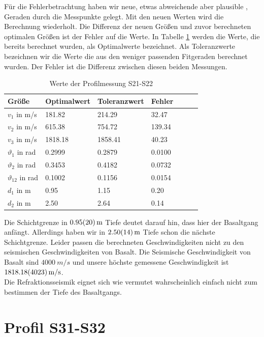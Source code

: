 Für die Fehlerbetrachtung haben wir neue, etwas abweichende aber plausible , Geraden durch die Messpunkte gelegt. Mit den neuen Werten wird die Berechnung wiederholt. Die Differenz der neuen Größen und zuvor berechneten optimalen Größen ist der Fehler auf die Werte. In Tabelle \ref{tab:S21-S22} werden die Werte, die bereits berechnet wurden, als Optimalwerte bezeichnet. Als Toleranzwerte bezeichnen wir die Werte die aus den weniger passenden Fitgeraden berechnet wurden. Der Fehler ist die Differenz zwischen diesen beiden Messungen.


\begin{table}[!ht]
\centering
\caption{Werte der Profilmessung S21-S22}
\label{tab:S21-S22}
\begin{tabular}{lllllll}
\toprule
Größe   & Optimalwert   & Toleranzwert   & Fehler \\
\midrule
$v_1$ in m/s & 181.82 & 214.29 & 32.47 \\
$v_2$ in m/s & 615.38 & 754.72 & 139.34 \\
$v_3$ in m/s & 1818.18 & 1858.41 & 40.23 \\
$\vartheta_1$ in rad & 0.2999 & 0.2879 & 0.0100 \\
$\vartheta_2$ in rad & 0.3453 & 0.4182 & 0.0732 \\
$\vartheta_{12}$ in rad & 0.1002 & 0.1156 & 0.0154 \\
$d_1$ in m & 0.95 & 1.15 & 0.20 \\
$d_2$ in m & 2.50 & 2.64 & 0.14 \\

\bottomrule
\end{tabular}
\end{table}


Die Schichtgrenze in $\SI{0.95 \pm 0.20}{m}$  Tiefe deutet darauf hin, dass hier der Basaltgang anfängt. Allerdings haben wir in $\SI{2.50 \pm 0.14}{m}$ Tiefe schon die nächste Schichtgrenze. Leider passen die berechneten Geschwindigkeiten nicht zu den seismischen Geschwindigkeiten von Basalt. Die Seismische Geschwindigkeit von Basalt sind $\SI{4000}{m/s}$ und unsere höchste gemessene Geschwindigkeit ist $\SI{1818.18 \pm 40.23}{m/s}$.\\
Die Refraktionsseismik eignet sich wie vermutet wahrscheinlich einfach nicht zum bestimmen der Tiefe des Basaltgangs. 


\section{Profil S31-S32}


